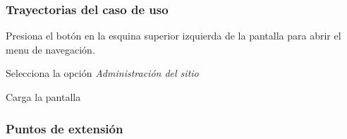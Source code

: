 \subsubsection{Trayectorias del caso de uso}

\begin{UCtrayectoria}%
%
 \Actor Presiona el botón \IUMenu en la esquina superior izquierda de la pantalla 
        para abrir el menu de navegación.

 \Actor Selecciona la opción {\it \IUAdminSitio Administración del sitio}

 \Sistema Carga la pantalla 

\end{UCtrayectoria}


\subsubsection{Puntos de extensión}


